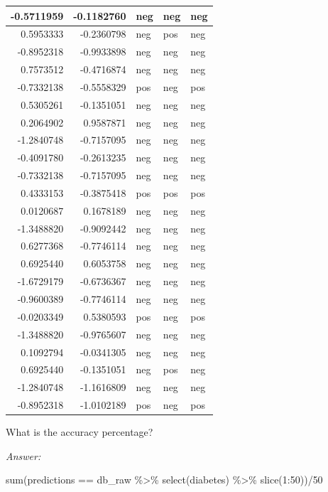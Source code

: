 \documentclass[
]{book}
\newenvironment{Shaded}{\begin{snugshade}}{\end{snugshade}}
\newcommand{\DecValTok}[1]{\textcolor[rgb]{0.00,0.00,0.81}{#1}}
\newcommand{\FunctionTok}[1]{\textcolor[rgb]{0.00,0.00,0.00}{#1}}
\newcommand{\NormalTok}[1]{#1}
\newcommand{\SpecialCharTok}[1]{\textcolor[rgb]{0.00,0.00,0.00}{#1}}
\begin{document}
\begin{tabular}{r|r|l|l|l}
\hline
-0.5711959 & -0.1182760 & neg & neg & neg\\
\hline
0.5953333 & -0.2360798 & neg & pos & neg\\
\hline
-0.8952318 & -0.9933898 & neg & neg & neg\\
\hline
0.7573512 & -0.4716874 & neg & neg & neg\\
\hline
-0.7332138 & -0.5558329 & pos & neg & pos\\
\hline
0.5305261 & -0.1351051 & neg & neg & neg\\
\hline
0.2064902 & 0.9587871 & neg & neg & neg\\
\hline
-1.2840748 & -0.7157095 & neg & neg & neg\\
\hline
-0.4091780 & -0.2613235 & neg & neg & neg\\
\hline
-0.7332138 & -0.7157095 & neg & neg & neg\\
\hline
0.4333153 & -0.3875418 & pos & pos & pos\\
\hline
0.0120687 & 0.1678189 & neg & neg & neg\\
\hline
-1.3488820 & -0.9092442 & neg & neg & neg\\
\hline
0.6277368 & -0.7746114 & neg & neg & neg\\
\hline
0.6925440 & 0.6053758 & neg & neg & neg\\
\hline
-1.6729179 & -0.6736367 & neg & neg & neg\\
\hline
-0.9600389 & -0.7746114 & neg & neg & neg\\
\hline
-0.0203349 & 0.5380593 & pos & neg & pos\\
\hline
-1.3488820 & -0.9765607 & neg & neg & neg\\
\hline
0.1092794 & -0.0341305 & neg & neg & neg\\
\hline
0.6925440 & -0.1351051 & neg & pos & neg\\
\hline
-1.2840748 & -1.1616809 & neg & neg & neg\\
\hline
-0.8952318 & -1.0102189 & pos & neg & pos\\
\hline
\end{tabular}

What is the accuracy percentage?

\emph{Answer:}

\begin{Shaded}
\begin{Highlighting}[]
\FunctionTok{sum}\NormalTok{(predictions }\SpecialCharTok{==}\NormalTok{ db\_raw }\SpecialCharTok{\%\textgreater{}\%} \FunctionTok{select}\NormalTok{(diabetes) }\SpecialCharTok{\%\textgreater{}\%} \FunctionTok{slice}\NormalTok{(}\DecValTok{1}\SpecialCharTok{:}\DecValTok{50}\NormalTok{))}\SpecialCharTok{/}\DecValTok{50}
\end{Highlighting}
\end{Shaded}
\end{document}
